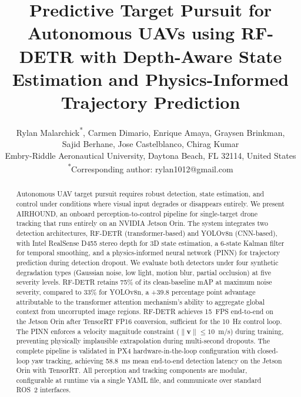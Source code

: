 \documentclass[11pt,letterpaper]{article}
\begin{document}
\title{Predictive Target Pursuit for Autonomous UAVs using RF-DETR with Depth-Aware State Estimation and Physics-Informed Trajectory Prediction}

\author{Rylan Malarchick\textsuperscript{*}, Carmen Dimario, Enrique Amaya, Graysen Brinkman, \\ Sajid Berhane, Jose Castelblanco, Chirag Kumar \\[4pt] Embry-Riddle Aeronautical University, Daytona Beach, FL 32114, United States \\[2pt] \textsuperscript{*}Corresponding author: rylan1012@gmail.com}

\date{}
\maketitle

\begin{abstract}
Autonomous UAV target pursuit requires robust detection, state estimation, and control under conditions where visual input degrades or disappears entirely. We present AIRHOUND, an onboard perception-to-control pipeline for single-target drone tracking that runs entirely on an NVIDIA Jetson Orin. The system integrates two detection architectures, RF-DETR (transformer-based) and YOLOv8n (CNN-based), with Intel RealSense D455 stereo depth for 3D state estimation, a 6-state Kalman filter for temporal smoothing, and a physics-informed neural network (PINN) for trajectory prediction during detection dropout. We evaluate both detectors under four synthetic degradation types (Gaussian noise, low light, motion blur, partial occlusion) at five severity levels. RF-DETR retains 75\% of its clean-baseline mAP at maximum noise severity, compared to 33\% for YOLOv8n, a +39.8 percentage point advantage attributable to the transformer attention mechanism's ability to aggregate global context from uncorrupted image regions. RF-DETR achieves 15~FPS end-to-end on the Jetson Orin after TensorRT FP16 conversion, sufficient for the 10~Hz control loop. The PINN enforces a velocity magnitude constraint ($\|\mathbf{v}\| \leq 10$~m/s) during training, preventing physically implausible extrapolation during multi-second dropouts. The complete pipeline is validated in PX4 hardware-in-the-loop configuration with closed-loop yaw tracking, achieving 58.8~ms mean end-to-end detection latency on the Jetson Orin with TensorRT. All perception and tracking components are modular, configurable at runtime via a single YAML file, and communicate over standard ROS~2 interfaces.
\end{abstract}
\end{document}
